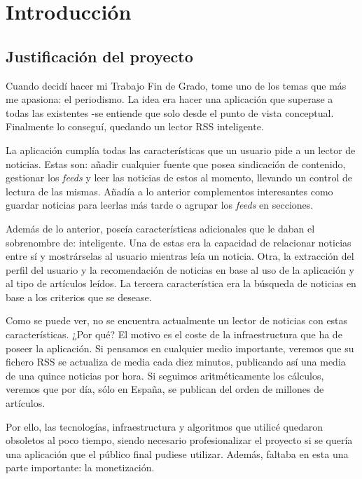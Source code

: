 
\chapter{Introducción}\label{introduccion}
\section{Justificación del proyecto}\label{sec:justificacion}

Cuando decidí hacer mi Trabajo Fin de Grado, tome uno de los temas que más me apasiona: el periodismo. La idea era hacer una aplicación que superase a todas las existentes -se entiende que solo desde el punto de vista conceptual. Finalmente lo conseguí, quedando un lector RSS inteligente.

La aplicación cumplía todas las características que un usuario pide a un lector de noticias. Estas son: añadir cualquier fuente que posea sindicación de contenido, gestionar los \textit{feeds} y leer las noticias de estos al momento, llevando un control de lectura de las mismas. Añadía a lo anterior complementos interesantes como guardar noticias para leerlas más tarde o agrupar los \textit{feeds} en secciones.

Además de lo anterior, poseía características adicionales que le daban el sobrenombre de: inteligente. Una de estas era la capacidad de relacionar noticias entre sí y mostrárselas al usuario mientras leía un noticia. Otra, la extracción del perfil del usuario y la recomendación de noticias en base al uso de la aplicación y al tipo de artículos leídos. La tercera característica era la búsqueda de noticias en base a los criterios que se desease.

Como se puede ver, no se encuentra actualmente un lector de noticias con estas características. ¿Por qué? El motivo es el coste de la infraestructura que ha de poseer la aplicación. Si pensamos en cualquier medio importante, veremos que su fichero RSS se actualiza de media cada diez minutos, publicando así una media de una quince noticias por hora. Si seguimos aritméticamente los cálculos, veremos que por día, sólo en España, se publican del orden de millones de artículos.

Por ello, las tecnologías, infraestructura y algoritmos que utilicé quedaron obsoletos al poco tiempo, siendo necesario profesionalizar el proyecto si se quería una aplicación que el público final pudiese utilizar. Además, faltaba en esta una parte importante: la monetización.

